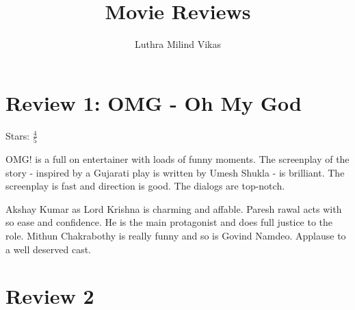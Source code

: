 \documentclass{article}
\author{Luthra Milind Vikas} %
\date{}
\title{Movie Reviews}
\begin{document}
\maketitle

\section{Review 1: OMG - Oh My God}

Stars: $\frac{4}{5}$


OMG! is a full on entertainer with loads of funny moments. The screenplay of the story - inspired by a Gujarati play is written by Umesh Shukla - is brilliant. The screenplay is fast and direction is good. The dialogs are top-notch.

Akshay Kumar as Lord Krishna is charming and affable. Paresh rawal acts with so ease and confidence. He is the main protagonist and does full justice to the role. Mithun Chakrabothy is really funny and so is Govind Namdeo. Applause to a well deserved cast.


\section{Review 2}
\end{document}
